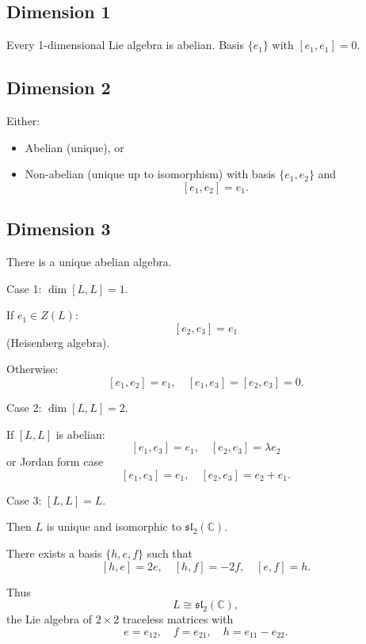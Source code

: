 \subsection*{Dimension 1}

Every 1-dimensional Lie algebra is abelian.
Basis $\{e_1\}$ with $[e_1,e_1]=0$.

\subsection*{Dimension 2}

Either:
\begin{itemize}
\item Abelian (unique), or
\item Non-abelian (unique up to isomorphism) with basis $\{e_1,e_2\}$ and
\[
[e_1,e_2]=e_1.
\]
\end{itemize}

\subsection*{Dimension 3}

There is a unique abelian algebra.

Case 1: $\dim [L,L] = 1$.

If $e_1 \in Z(L)$:
\[
[e_2,e_3] = e_1
\]
(Heisenberg algebra).

Otherwise:
\[
[e_1,e_2] = e_1, \quad [e_1,e_3]=[e_2,e_3]=0.
\]

Case 2: $\dim [L,L]=2$.

If $[L,L]$ is abelian:
\[
[e_1,e_3]=e_1, \quad [e_2,e_3]=\lambda e_2
\]
or Jordan form case
\[
[e_1,e_3]=e_1, \quad [e_2,e_3]=e_2 + e_1.
\]

Case 3: $[L,L]=L$.

Then $L$ is unique and isomorphic to $\mathfrak{sl}_2(\mathbb{C})$.

There exists a basis $\{h,e,f\}$ such that
\[
[h,e]=2e, \quad [h,f]=-2f, \quad [e,f]=h.
\]

Thus
\[
L \cong \mathfrak{sl}_2(\mathbb{C}),
\]
the Lie algebra of $2\times2$ traceless matrices with
\[
e=e_{12}, \quad f=e_{21}, \quad h=e_{11}-e_{22}.
\]